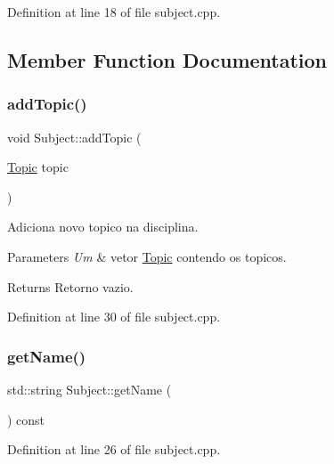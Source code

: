 Definition at line 18 of file subject.\+cpp.



\subsection{Member Function Documentation}
\mbox{\label{class_subject_a784773913acee5fdef548bc9cd7e8aca}} 
\subsubsection{\texorpdfstring{add\+Topic()}{addTopic()}}
{\footnotesize\ttfamily void Subject\+::add\+Topic (\begin{DoxyParamCaption}\item[{\hyperlink{class_topic}{Topic}}]{topic }\end{DoxyParamCaption})}



Adiciona novo topico na disciplina. 


\begin{DoxyParams}{Parameters}
{\em Um} & vetor \hyperlink{class_topic}{Topic} contendo os topicos. \\
\hline
\end{DoxyParams}
\begin{DoxyReturn}{Returns}
Retorno vazio. 
\end{DoxyReturn}


Definition at line 30 of file subject.\+cpp.

\mbox{\label{class_subject_ad81aadc033a880e7cde2c10daf34ea2f}} 
\subsubsection{\texorpdfstring{get\+Name()}{getName()}}
{\footnotesize\ttfamily std\+::string Subject\+::get\+Name (\begin{DoxyParamCaption}{ }\end{DoxyParamCaption}) const}



Definition at line 26 of file subject.\+cpp.

\mbox{\label{class_subject_ab50189ef9c4edf65cf9218f5d956bf4b}} 

